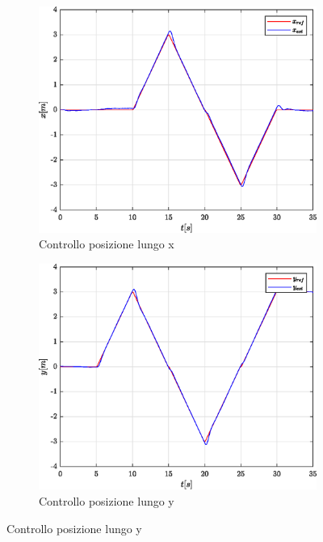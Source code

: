 \begin{figure}
	\centering
	\begin{subfigure}{0.45\textwidth}
		\centering
		\includegraphics[width=1\textwidth]{Simulazioni/Figure/SMC/SQUARE/PositionControlXPos}
		\caption{Controllo posizione lungo x}
		\label{fig:SQUAREerrposxSMC}
	\end{subfigure}
	\hfill
	\begin{subfigure}{0.45\textwidth}
		\centering
		\includegraphics[width=1\textwidth]{Simulazioni/Figure/SMC/SQUARE/PositionControlYPos}
		\caption{Controllo posizione lungo y}

\end{subfigure}
\end{figure}
